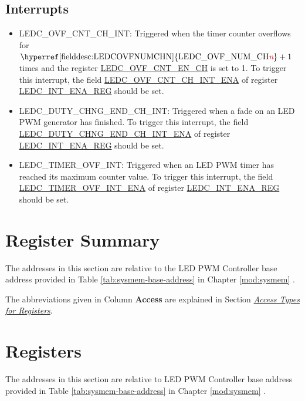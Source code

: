 \documentclass[main\_\_EN.tex]{subfiles}
\begin{document}
\subsection{Interrupts}
\begin{itemize}
\item \label{int:ledc-ovf-cnt}LEDC\_OVF\_CNT\_CH\_INT: Triggered when the timer counter overflows for $ \textrm{\hyperref[fielddesc:LEDCOVFNUMCHN]{LEDC\_OVF\_NUM\_CH\regindex{n}}} + 1 $ times and the register \hyperref[fielddesc:LEDCOVFCNTENCHN]{LEDC\_OVF\_CNT\_EN\_CH} is set to 1. To trigger this interrupt, the field \hyperref[fielddesc:LEDCOVFCNTCHNINTENA]{LEDC\_OVF\_CNT\_CH\_INT\_ENA} of register \hyperref[regdesc:LEDCINTENAREG]{LEDC\_INT\_ENA\_REG} should be set.
\item \label{int:ledc-duty-chng-end}LEDC\_DUTY\_CHNG\_END\_CH\_INT: Triggered when a fade on an LED PWM generator has finished. To trigger this interrupt, the field \hyperref[fielddesc:LEDCDUTYCHNGENDCHNINTENA]{LEDC\_DUTY\_CHNG\_END\_CH\_INT\_ENA} of register \hyperref[regdesc:LEDCINTENAREG]{LEDC\_INT\_ENA\_REG} should be set.
\item \label{int:ledc-timer-ovf}LEDC\_TIMER\_OVF\_INT: Triggered when an LED PWM timer has reached its maximum counter value. To trigger this interrupt, the field \hyperref[fielddesc:LEDCTIMERXOVFINTENA]{LEDC\_TIMER\_OVF\_INT\_ENA} of register \hyperref[regdesc:LEDCINTENAREG]{LEDC\_INT\_ENA\_REG} should be set.
\end{itemize}



\clearpage
\hypertarget{ledpwm-reg-summ}{}
\section{Register Summary}
\label{sec:ledc-reg-summ}


The addresses in this section are relative to the LED PWM Controller base address provided in Table \ref{tab:sysmem-base-address} in Chapter \ref{mod:sysmem} \textit{}.

The abbreviations given in Column \textbf{Access} are explained in Section \hyperref[glossary-access-types]{\textit{Access Types for Registers}}.





\clearpage
\section{Registers}
\label{sec:ledc-reg-field}

The addresses in this section are relative to LED PWM Controller base address provided in Table \ref{tab:sysmem-base-address} in Chapter \ref{mod:sysmem} \textit{}.


\end{document}
